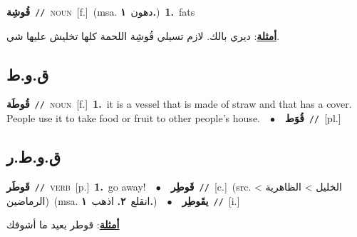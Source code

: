 \documentclass[10pt,a4paper,twoside]{article} %
\begin{document}
\begin{multicols}{2}
{\setlength\topsep{0pt}\textbf{\foreignlanguage{arabic}{قُوشِة}}\ {\color{gray}\texttt{//}\color{black}}\ \textsc{noun}\ [f.]\ \color{gray}(msa. \foreignlanguage{arabic}{دهون}~\foreignlanguage{arabic}{\textbf{١.}})\color{black}\ \textbf{1.}~fats\  \begin{flushright}\color{gray}\foreignlanguage{arabic}{\textbf{\underline{\foreignlanguage{arabic}{أمثلة}}}: ديري بالك. لازم تسيلي قُوشِة اللحمة كلها تخليش عليها شي.}\end{flushright}\color{black}} \vspace{2mm}

\vspace{-3mm}
\subsection*{\color{blue}\foreignlanguage{arabic}{ق.و.ط}\color{blue}{}} 

{\setlength\topsep{0pt}\textbf{\foreignlanguage{arabic}{قُوطَة}}\ {\color{gray}\texttt{//}\color{black}}\ \textsc{noun}\ [f.]\ \textbf{1.}~it is a vessel that is made of straw and that has a cover. People use it to take food or fruit to other people's house.\ \ $\bullet$\ \ \setlength\topsep{0pt}\textbf{\foreignlanguage{arabic}{قُوَط}}\ {\color{gray}\texttt{//}\color{black}}\ [pl.]\ } \vspace{2mm}

\vspace{-3mm}
\subsection*{\color{blue}\foreignlanguage{arabic}{ق.و.ط.ر}\color{blue}{}} 

{\setlength\topsep{0pt}\textbf{\foreignlanguage{arabic}{قَوطَر}}\ {\color{gray}\texttt{//}\color{black}}\ \textsc{verb}\ [p.]\ \textbf{1.}~go away!\ \ $\bullet$\ \ \setlength\topsep{0pt}\textbf{\foreignlanguage{arabic}{قَوطِر}}\ {\color{gray}\texttt{//}\color{black}}\ [c.]\ (src. \color{gray}\foreignlanguage{arabic}{الخليل > الظاهرية > الرماضين}\color{black})\ \color{gray}(msa. \foreignlanguage{arabic}{انقلع}~\foreignlanguage{arabic}{\textbf{٢.}}  \foreignlanguage{arabic}{اذهب}~\foreignlanguage{arabic}{\textbf{١.}})\color{black}\ \ $\bullet$\ \ \setlength\topsep{0pt}\textbf{\foreignlanguage{arabic}{يقَوطِر}}\ {\color{gray}\texttt{//}\color{black}}\ [i.]\  \begin{flushright}\color{gray}\foreignlanguage{arabic}{\textbf{\underline{\foreignlanguage{arabic}{أمثلة}}}: قوطر بعيد ما أشوفك}\end{flushright}\color{black}} \vspace{2mm}


\end{multicols}
\end{document}
